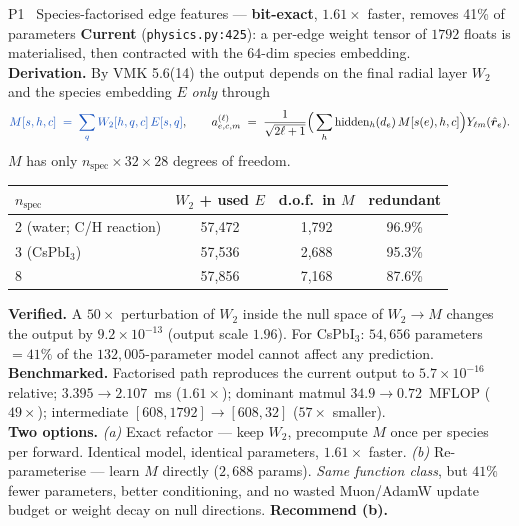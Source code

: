\documentclass[10pt,a4paper]{article}
\newcommand{\NEW}[1]{\textcolor{NEWblue}{#1}}
\newcommand{\rr}{\bm{r}}
\newcommand{\code}[1]{\texttt{\small #1}}
\begin{document}
\begin{planbox}{P1 \ Species-factorised edge features --- \textbf{bit-exact}, $1.61\times$ faster, removes 41\% of parameters}
\footnotesize\textbf{Current} (\code{physics.py:425}): a per-edge weight tensor of
$1792$ floats is materialised, then contracted with the $64$-dim species embedding.\\[3pt]
\textbf{Derivation.} By VMK 5.6(14) the output depends on the final radial layer $W_2$
and the species embedding $E$ \emph{only} through
\[
\NEW{M[s,h,c] \;=\; \sum_q W_2[h,q,c]\,E[s,q]},
\qquad
a^{(\ell)}_{e,c,m} \;=\; \frac{1}{\sqrt{2\ell+1}}\Big(\sum_h \mathrm{hidden}_h(d_e)\,M[s(e),h,c]\Big)Y_{\ell m}(\hat{\rr}_e).
\]
$M$ has only $n_{\mathrm{spec}}\times32\times28$ degrees of freedom.\\[3pt]
\begin{center}\footnotesize
\begin{tabular}{@{}lccc@{}}
\toprule
$n_{\mathrm{spec}}$ & $W_2$ + used $E$ & d.o.f.\ in $M$ & redundant\\
\midrule
2 (water; C/H reaction) & 57{,}472 & 1{,}792 & \NEW{96.9\%}\\
3 (CsPbI$_3$)           & 57{,}536 & 2{,}688 & \NEW{95.3\%}\\
8                       & 57{,}856 & 7{,}168 & 87.6\%\\
\bottomrule
\end{tabular}
\end{center}
\vspace{2pt}
\textbf{Verified.} A $50\times$ perturbation of $W_2$ inside the null space of $W_2\!\to\!M$
changes the output by $9.2\times10^{-13}$ (output scale $1.96$).
For CsPbI$_3$: \NEW{$54{,}656$ parameters $=41\%$ of the $132{,}005$-parameter model
cannot affect any prediction.}\\[3pt]
\textbf{Benchmarked.} Factorised path reproduces the current output to
$5.7\times10^{-16}$ relative; $3.395\to2.107$~ms (\NEW{$1.61\times$}); dominant matmul
$34.9\to0.72$~MFLOP (\NEW{$49\times$}); intermediate $[608,1792]\to[608,32]$ ($57\times$ smaller).\\[3pt]
\textbf{Two options.} \emph{(a)} Exact refactor --- keep $W_2$, precompute $M$ once per
species per forward. Identical model, identical parameters, $1.61\times$ faster.
\emph{(b)} Re-parameterise --- learn $M$ directly ($2{,}688$ params). \emph{Same function
class}, but $41\%$ fewer parameters, better conditioning, and no wasted Muon/AdamW
update budget or weight decay on null directions. \textbf{Recommend (b).}
\end{planbox}
\end{document}
